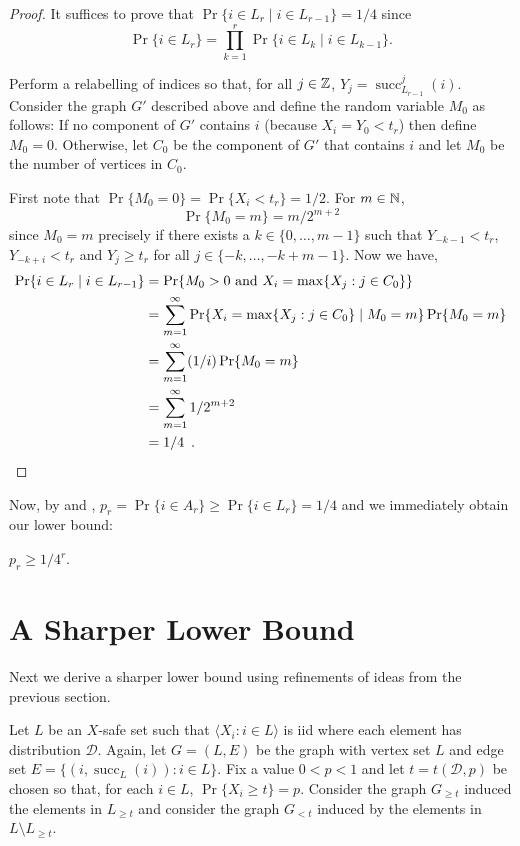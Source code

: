 \documentclass{patmorin}
\DeclareMathOperator{\cw}{succ}
\begin{document}
\begin{proof}
   It suffices to prove that $\Pr\{i\in L_r \mid i\in L_{r-1}\} = 1/4$
   since \[ \Pr\{i\in L_r\} = \prod_{k=1}^r \Pr\{i\in L_k\mid i\in L_{k-1}\} .\]

   Perform a relabelling of indices so that, for all $j\in\mathbb{Z}$,
   $Y_j=\cw^j_{L_{r-1}}(i)$. Consider the graph $G'$ described above and
   define the random variable $M_0$ as follows:  If no component of $G'$
   contains $i$ (because $X_i=Y_0<t_r$) then define $M_0=0$.  Otherwise,
   let $C_0$ be the component of $G'$ that contains $i$ and let $M_0$
   be the number of vertices in $C_0$.

   First note that $\Pr\{M_0=0\}=\Pr\{X_i<t_r\}=1/2$.
   For $m \in \mathbb{N}$, 
   \[
       \Pr\{M_0=m\} = m/2^{m+2}
   \]
   since $M_0=m$ precisely if there exists a $k\in\{0,\ldots,m-1\}$
   such that $Y_{-k-1}< t_r$, $Y_{-k+i}<t_r$ and $Y_j \ge t_r$ for all
   $j\in\{-k,\ldots,-k+m-1\}$.  Now we have,
   \begin{align*}
      \Pr\{i\in L_r\mid i\in L_{r-1}\} 
          & = \Pr\{\mbox{$M_0>0$ and $X_i=\max\{X_j:j\in C_0\}$}\} \\
          & = \sum_{m=1}^\infty \Pr\{X_i=\max\{X_j:j\in C_0\}\mid M_0=m\}\Pr\{M_0=m\} \\ 
          & = \sum_{m=1}^\infty (1/i)\Pr\{M_0=m\} \\
          & = \sum_{m=1}^\infty 1/2^{m+2} \\
          & = 1/4 \enspace . \qedhere
   \end{align*}
\end{proof}


Now, by  and , $p_r=\Pr\{i\in
A_r\} \ge \Pr\{i\in L_r\}=1/4$ and we immediately obtain our lower bound:
\begin{cor}
   $p_r \ge 1/4^r$.
\end{cor}


\section{A Sharper Lower Bound}

Next we derive a sharper lower bound using refinements of ideas
from the previous section.

Let $L$ be an $X$-safe set such that $\langle X_i: i\in L\rangle$ is iid where
each element has distribution $\mathcal{D}$.  Again, let $G=(L,E)$ be the
graph with vertex set $L$ and edge set $E=\{(i,\cw_L(i)): i\in L\}$.
Fix a value $0<p<1$ and let $t=t(\mathcal{D},p)$ be chosen so that, for each $i\in L$,
$\Pr\{X_i\ge t\} = p$.  Consider the graph $G_{\ge t}$ induced the
elements in $L_{\ge t}$ and consider the graph $G_{<t}$ induced by the
elements in $L\setminus L_{\ge t}$.
\end{document}
